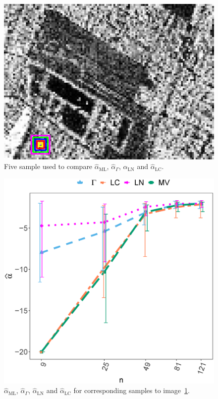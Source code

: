 \documentclass[twocolumn]{svjour3}
\begin{document}
\begin{figure}[htb]
	\centering
	\includegraphics[width=0.7\linewidth]{../../../Figures/PaperTesis/CincoMuestras.eps}
	\caption{\label{CincoMuestras}\small Five sample used to compare $\widehat{\alpha}_{\text{{ML}}}$, $\widehat{\alpha}_{\Gamma}$, $\widehat{\alpha}_{\text{{LN}}}$ and  $\widehat{\alpha}_{\text{{LC}}}$.}
\end{figure}
\begin{figure}[htb]
	\centering
	\includegraphics[width=0.7\linewidth]{../../../Figures/PaperTesis/AlfaVsTamCincoMuestras_v2.eps}
	\caption{\label{AlfaVsTamCincoMuestras}\small $\widehat{\alpha}_{\text{{ML}}}$, $\widehat{\alpha}_{\Gamma}$, $\widehat{\alpha}_{\text{{LN}}}$ and $\widehat{\alpha}_{\text{{LC}}}$ for corresponding samples to image~\ref{CincoMuestras}.}
\end{figure}
\end{document}
